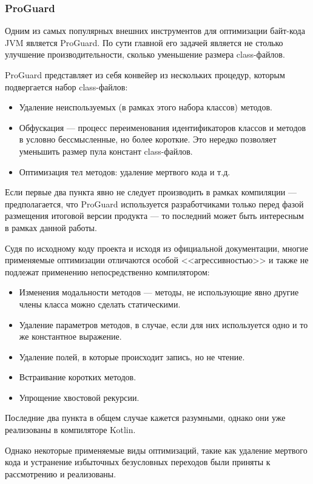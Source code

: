 \subsubsection{ProGuard}
Одним из самых популярных внешних инструментов для оптимизации байт-кода JVM является ProGuard.
По сути главной его задачей является не столько улучшение производительности, сколько уменьшение
размера class-файлов.

ProGuard представляет из себя конвейер из нескольких процедур, которым подвергается набор
class-файлов:
\begin{itemize}
    \item Удаление неиспользуемых (в рамках этого набора классов) методов.
    \item Обфускация --- процесс переименования идентификаторов классов и методов в условно
    бессмысленные, но более короткие. Это нередко позволяет уменьшить размер
    пула констант class-файлов.
    \item Оптимизация тел методов: удаление мертвого кода и т.д.
\end{itemize}

Если первые два пункта явно не следует производить в рамках компиляции --- предполагается,
что ProGuard используется разработчиками только перед фазой размещения итоговой версии продукта ---
то последний может быть интересным в рамках данной работы.

Судя по исходному коду проекта и исходя из официальной документации, %
многие применяемые оптимизации отличаются особой <<агрессивностью>> и также не подлежат
применению непосредственно компилятором:
\begin{itemize}
    \item Изменения модальности методов --- методы, не использующие явно другие члены класса можно
    сделать статическими.
    \item Удаление параметров методов, в случае, если для них используется одно и то же константное
    выражение.
    \item Удаление полей, в которые происходит запись, но не чтение.
    \item Встраивание коротких методов.
    \item Упрощение хвостовой рекурсии.
\end{itemize}

Последние два пункта в общем случае кажется разумными, однако они уже реализованы в компиляторе
Kotlin.

Однако некоторые применяемые виды оптимизаций, такие как удаление мертвого кода
и устранение избыточных безусловных переходов были приняты к рассмотрению и реализованы.
